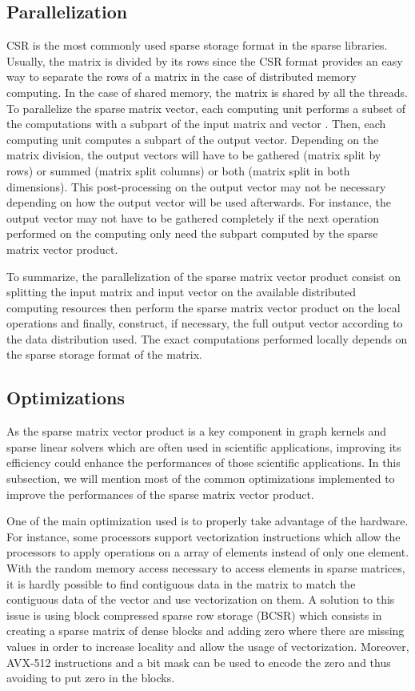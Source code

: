\subsection{Parallelization}
CSR is the most commonly used sparse storage format in the sparse libraries.
Usually, the matrix is divided by its rows \cite{YeCP2015} since the CSR format provides an easy way to separate the rows of a matrix in the case of distributed memory computing.
In the case of shared memory, the matrix is shared by all the threads.
To parallelize the sparse matrix vector, each computing unit performs a subset of the computations with a subpart of the input matrix and vector \cite{PageK2018}.
Then, each computing unit computes a subpart of the output vector.
Depending on the matrix division, the output vectors will have to be gathered (matrix split by rows) or summed (matrix split columns) or both (matrix split in both dimensions).
This post-processing on the output vector may not be necessary depending on how the output vector will be used afterwards.
For instance, the output vector may not have to be gathered completely if the next operation performed on the computing only need the subpart computed by the sparse matrix vector product.


To summarize, the parallelization of the sparse matrix vector product consist on splitting the input matrix and input vector on the available distributed computing resources then perform the sparse matrix vector product on the local operations and finally, construct, if necessary, the full output vector according to the data distribution used.
The exact computations performed locally \cite{FeWPS1993} depends on the sparse storage format of the matrix.


\subsection{Optimizations}
As the sparse matrix vector product is a key component in graph kernels and sparse linear solvers which are often used in scientific applications, improving its efficiency could enhance the performances of those scientific applications.
In this subsection, we will mention most of the common optimizations implemented to improve the performances of the sparse matrix vector product.

One of the main optimization used is to properly take advantage of the hardware.
For instance, some processors support vectorization instructions which allow the processors to apply operations on a array of elements instead of only one element.
With  the random memory access necessary to access elements in sparse matrices, it is hardly possible to find contiguous data in the matrix to match the contiguous data of the vector and use vectorization on them.
A solution to this issue is using block compressed sparse row storage (BCSR) \cite{PinaH1999} which consists in creating a sparse matrix of dense blocks and adding zero where there are missing values in order to increase locality \cite{Toledo1997} and allow the usage of vectorization.
Moreover, AVX-512 instructions and a bit mask can be used to encode the zero \cite{BramK2018} and thus avoiding to put zero in the blocks.


